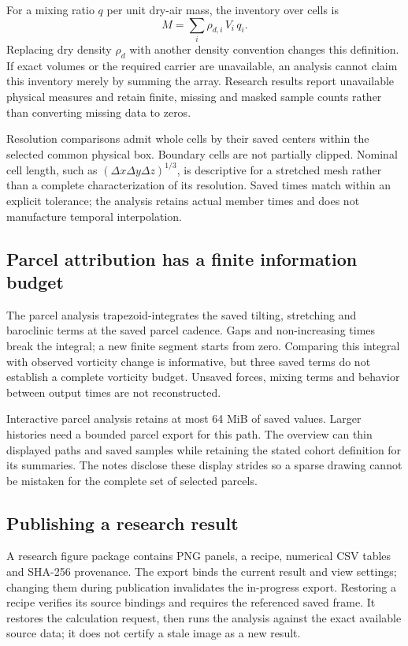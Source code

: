 For a mixing ratio $q$ per unit dry-air mass, the inventory over cells is
\begin{equation}
 M=\sum_i \rho_{d,i}\,V_i\,q_i.
\end{equation}
Replacing dry density $\rho_d$ with another density convention changes this
definition. If exact volumes or the required carrier are unavailable, an
analysis cannot claim this inventory merely by summing the array. Research
results report unavailable physical measures and retain finite, missing and
masked sample counts rather than converting missing data to zeros.

Resolution comparisons admit whole cells by their saved centers within the
selected common physical box. Boundary cells are not partially clipped.
Nominal cell length, such as $(\Delta x\Delta y\Delta z)^{1/3}$, is descriptive
for a stretched mesh rather than a complete characterization of its resolution.
Saved times match within an explicit tolerance; the analysis retains actual
member times and does not manufacture temporal interpolation.

\subsection{Parcel attribution has a finite information budget}
The parcel analysis trapezoid-integrates the saved tilting, stretching and
baroclinic terms at the saved parcel cadence. Gaps and non-increasing times break
the integral; a new finite segment starts from zero. Comparing this integral
with observed vorticity change is informative, but three saved terms do not
establish a complete vorticity budget. Unsaved forces, mixing terms and behavior
between output times are not reconstructed.

Interactive parcel analysis retains at most 64 MiB of saved values. Larger
histories need a bounded parcel export for this path. The overview can thin
displayed paths and saved samples while retaining the stated cohort definition
for its summaries. The notes disclose these display strides so a sparse drawing
cannot be mistaken for the complete set of selected parcels.

\subsection{Publishing a research result}
A research figure package contains PNG panels, a recipe, numerical CSV tables
and SHA-256 provenance. The export binds the current result and view settings;
changing them during publication invalidates the in-progress export. Restoring
a recipe verifies its source bindings and requires the referenced saved frame.
It restores the calculation request, then runs the analysis against the exact
available source data; it does not certify a stale image as a new result.

